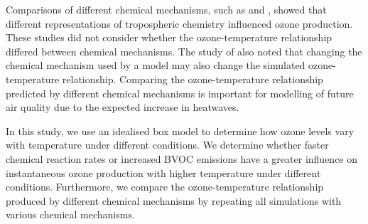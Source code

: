 Comparisons of different chemical mechanisms, such as \citet{Emmerson:2009} and \citet{Coates:2015}, showed that different representations of tropospheric chemistry influenced ozone production.
These studies did not consider whether the ozone-temperature relationship differed between chemical mechanisms.
The study of \citet{Rasmussen:2013} also noted that changing the chemical mechanism used by a model may also change the simulated ozone-temperature relationship.
Comparing the ozone-temperature relationship predicted by different chemical mechanisms is important for modelling of future air quality due to the expected increase in heatwaves.

In this study, we use an idealised box model to determine how ozone levels vary with temperature under different  conditions.
We determine whether faster chemical reaction rates or increased BVOC emissions have a greater influence on instantaneous ozone production with higher temperature under different  conditions.
Furthermore, we compare the ozone-temperature relationship produced by different chemical mechanisms by repeating all simulations with various chemical mechanisms.
